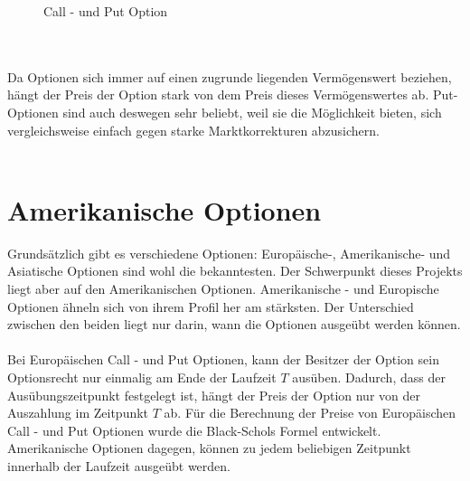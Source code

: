 \documentclass[12pt,a4paper]{article}
\begin{document}
\begin{text}
\begin{figure}[h]
\begin{center}
 \caption{Call - und Put Option}
\end{center}
\end{figure}
\\\\
Da Optionen sich immer auf einen zugrunde liegenden Vermögenswert beziehen, hängt der Preis der Option stark von dem Preis dieses Vermögenswertes ab. Put-Optionen sind auch deswegen sehr beliebt, weil sie die Möglichkeit bieten, sich vergleichsweise einfach gegen starke Marktkorrekturen abzusichern.
\\\\

\section{Amerikanische Optionen}
Grundsätzlich gibt es verschiedene Optionen: Europäische-, Amerikanische- und Asiatische Optionen sind wohl die bekanntesten. Der Schwerpunkt dieses Projekts liegt aber auf den Amerikanischen Optionen. Amerikanische - und Europische Optionen ähneln sich von ihrem Profil her am stärksten. Der Unterschied zwischen den beiden liegt nur darin, wann die Optionen ausgeübt werden können. 
\\\\
Bei Europäischen Call - und Put Optionen, kann der Besitzer der Option sein Optionsrecht nur einmalig am Ende der Laufzeit $T$ ausüben. Dadurch, dass der Ausübungszeitpunkt festgelegt ist, hängt der Preis der Option nur von der Auszahlung im Zeitpunkt $T$ ab. Für die Berechnung der Preise von Europäischen Call - und Put Optionen wurde die Black-Schols Formel entwickelt.
\\
Amerikanische Optionen dagegen, können zu jedem beliebigen Zeitpunkt innerhalb der Laufzeit ausgeübt werden. 
\\\\

\newpage

\end{text}
\end{document}
